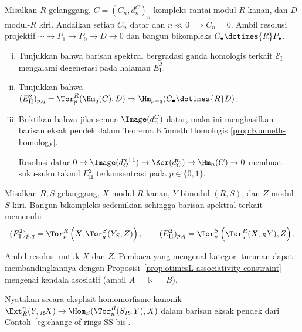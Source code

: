 \begin{Exercises}
	\item Misalkan $R$ gelanggang,
	$C=(C_n,d^C_n)_n$ kompleks rantai modul-$R$ kanan, dan $D$ modul-$R$ kiri.
	Andaikan setiap $C_n$ datar dan $n\ll0\implies C_n=0$. Ambil resolusi
	projektif $\cdots\to P_1\to P_0\to D\to0$ dan bangun bikompleks
	$C_\bullet\dotimes{R}P_\bullet$.
	\begin{enumerate}[(i)]
		\item Tunjukkan bahwa barisan spektral bergradasi ganda homologis terkait
		$\mathscr{E}_{\mathrm{I}}$ mengalami degenerasi pada halaman
		$E_{\mathrm{I}}^2$.
		\item Tunjukkan bahwa
		$(E_{\mathrm{II}}^2)_{p,q}=\Tor^R_p(\Hm_q(C),D)
		\Rightarrow\Hm_{p+q}(C_\bullet\dotimes{R}D)$.
		\item Buktikan bahwa jika semua $\Image(d^C_n)$ datar, maka ini
		menghasilkan barisan eksak pendek dalam Teorema K\"unneth Homologis
		\ref{prop:Kunneth-homology}.
		\begin{hint}
			Resolusi datar
			$0\to\Image(d_C^{n+1})\to\Ker(d_C^n)\to\Hm_n(C)\to0$
			membuat suku-suku taknol $E_{\mathrm{II}}^2$ terkonsentrasi pada
			$p\in\{0,1\}$.
		\end{hint}
	\end{enumerate}

	\item Misalkan $R,S$ gelanggang, $X$ modul-$R$ kanan, $Y$ bimodul-$(R,S)$,
	dan $Z$ modul-$S$ kiri. Bangun bikompleks sedemikian sehingga barisan
	spektral terkait memenuhi
	\[ (E_{\mathrm{I}}^2)_{p,q}
	=\Tor^R_p\left(X,\Tor^S_q(Y_S,Z)\right),\qquad
	(E_{\mathrm{II}}^2)_{p,q}
	=\Tor^S_p\left(\Tor^R_q(X,{}_RY),Z\right). \]
	\begin{hint}
		Ambil resolusi untuk $X$ dan $Z$. Pembaca yang mengenal kategori turunan
		dapat membandingkannya dengan Proposisi~\ref{prop:otimesL-associativity-constraint}
		mengenai kendala asosiatif (ambil $A=\Bbbk=B$).
	\end{hint}

	\item Nyatakan secara eksplisit homomorfisme kanonik
	$\Ext^n_R(Y,{}_RX)\to\Hom_S(\Tor^R_n(S_R,Y),X)$ dalam barisan eksak pendek
	dari Contoh~\ref{eg:change-of-rings-SS-bis}.
\end{Exercises}
